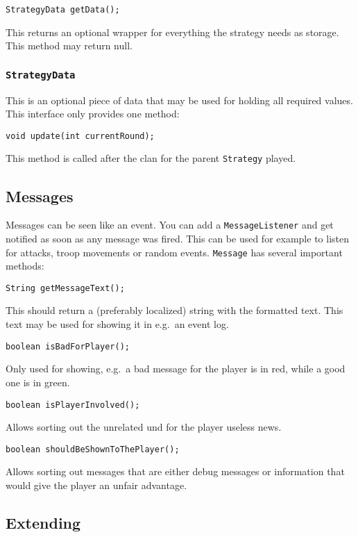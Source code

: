\documentclass{article}
\begin{document}
    \begin{verbatim}
StrategyData getData();
    \end{verbatim}
    This returns an optional wrapper for everything the strategy needs as storage.
    This method may return null.

    \subsubsection{\texttt{StrategyData}}
    This is an optional piece of data that may be used for holding all required values.
    This interface only provides one method:
    \begin{verbatim}
void update(int currentRound);
    \end{verbatim}
    This method is called after the clan for the parent \texttt{Strategy} played.

    \subsection{Messages}
    Messages can be seen like an event.
    You can add a \texttt{MessageListener} and get notified as soon as any message was fired.
    This can be used for example to listen for attacks, troop movements or random events.
    \texttt{Message} has several important methods:
    \begin{verbatim}
String getMessageText();
    \end{verbatim}
    This should return a (preferably localized) string with the formatted text.
    This text may be used for showing it in e.g.\ an event log.
    \begin{verbatim}
boolean isBadForPlayer();
    \end{verbatim}
    Only used for showing, e.g.\ a bad message for the player is in red, while a good one is in green.
    \begin{verbatim}
boolean isPlayerInvolved();
    \end{verbatim}
    Allows sorting out the unrelated und for the player useless news.
    \begin{verbatim}
boolean shouldBeShownToThePlayer();
    \end{verbatim}
    Allows sorting out messages that are either debug messages or information that would give the player an unfair advantage.
    \newpage

    \subsection{Extending}
\end{document}
